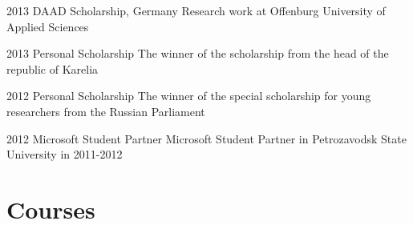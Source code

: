\documentclass{tccv}
\begin{document}
\begin{yearlist}
\item{2013}
     {DAAD Scholarship, Germany}
     {Research work at Offenburg University of Applied Sciences}

\item{2013}
     {Personal Scholarship}
     {The winner of the scholarship from the head of the republic of Karelia}

\item{2012}
     {Personal Scholarship}
     {The winner of the special scholarship for young researchers from the Russian Parliament}

\item{2012}
     {Microsoft Student Partner}
     {Microsoft Student Partner in Petrozavodsk State University in 2011-2012}
\end{yearlist}

\section{Courses}
\end{document}
